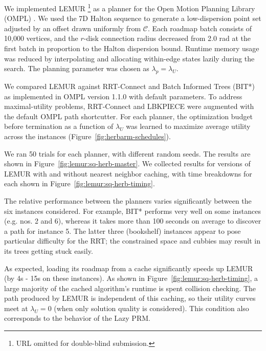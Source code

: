We implemented LEMUR%
\footnote{URL omitted for double-blind submission.}
as a planner for
the Open Motion Planning Library (OMPL) \citep{sucan2012ompl}.
We used the 7D Halton sequence to generate a low-dispersion
point set adjusted by an offset drawn uniformly
from $\mathcal{C}$.
Each roadmap batch consists of 10,000 vertices,
and the $r$-disk connection radius decreased from 2.0 rad
at the first batch in proportion to the Halton dispersion bound.
Runtime memory usage was reduced by interpolating and allocating
within-edge states lazily during the search.
The planning parameter was chosen as $\lambda_p = \lambda_U$.

We compared LEMUR against
RRT-Connect \citep{kuffner2000rrtconnect}
and Batch Informed Trees (BIT*) \citep{gammell2015bitstar}
as implemented in OMPL version 1.1.0
with default parameters.
To address maximal-utility problems,
RRT-Connect and LBKPIECE were augmented with the default OMPL
path shortcutter.
For each planner,
the optimization budget before termination
as a function of $\lambda_U$
was learned to maximize average utility across the instances
(Figure~\ref{fig:herbarm-schedules}).

We ran 50 trials for each planner,
with different random seeds.
The results are shown in Figure~\ref{fig:lemur:sq-herb-master}.
We collected results for versions of LEMUR with and without
nearest neighbor caching,
with time breakdowns for each shown in
Figure~\ref{fig:lemur:sq-herb-timing}.

The relative performance between the planners varies
significantly between the six instances considered.
For example, BIT* performs very well on some instances
(e.g. nos. 2 and 6),
whereas it takes more than 100 seconds on average to discover
a path for instance 5.
The latter three (bookshelf) instances appear to pose particular
difficulty for the RRT;
the constrained space and cubbies may result in its trees
getting stuck easily.

As expected,
loading its roadmap from a cache
significantly speeds up LEMUR (by 4s - 15s on these instances).
As shown in Figure~\ref{fig:lemur:sq-herb-timing},
a large majority of the cached algorithm's runtime is spent
collision checking.
The path produced by LEMUR is independent of this caching,
so their utility curves meet at $\lambda_U = 0$
(when only solution quality is considered).
This condition also corresponds to the behavior of the Lazy PRM.

